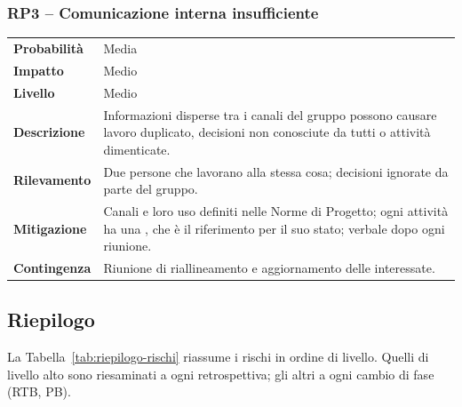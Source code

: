 \documentclass[documento]{gpt}
\makeatletter
\newcommand{\rischio}[9]{%
  \subsubsection{#1 -- #2}\label{rischio:#1}
  \noindent
  \begin{tabularx}{\linewidth}{@{}>{\raggedright\arraybackslash\bfseries}p{2.7cm}>{\raggedright\arraybackslash}X@{}}
    \toprule
    Probabilità & #3 \\
    Impatto     & #4 \\
    Livello     & #5 \\
    \midrule
    Descrizione & #6 \\
    \addlinespace
    Rilevamento & #7 \\
    \addlinespace
    Mitigazione & #8 \\
    \addlinespace
    Contingenza & #9 \\
    \bottomrule
  \end{tabularx}
  \medskip
}
\makeatother
\begin{document}
\rischio{RP3}{Comunicazione interna insufficiente}{Media}{Medio}{Medio}
{Informazioni disperse tra i canali del gruppo possono causare lavoro
 duplicato, decisioni non conosciute da tutti o attività dimenticate.}
{Due persone che lavorano alla stessa cosa; decisioni ignorate da parte
 del gruppo.}
{Canali e loro uso definiti nelle Norme di Progetto; ogni attività ha una
 \glo[Issue]{\textit{issue}}, che è il riferimento per il suo stato; verbale dopo ogni
 riunione.}
{Riunione di riallineamento e aggiornamento delle \glo[Issue]{\textit{issue}} interessate.}

\subsection{Riepilogo}
La Tabella~\ref{tab:riepilogo-rischi} riassume i rischi in ordine di
livello. Quelli di livello alto sono riesaminati a ogni retrospettiva;
gli altri a ogni cambio di fase (RTB, PB).
\end{document}
